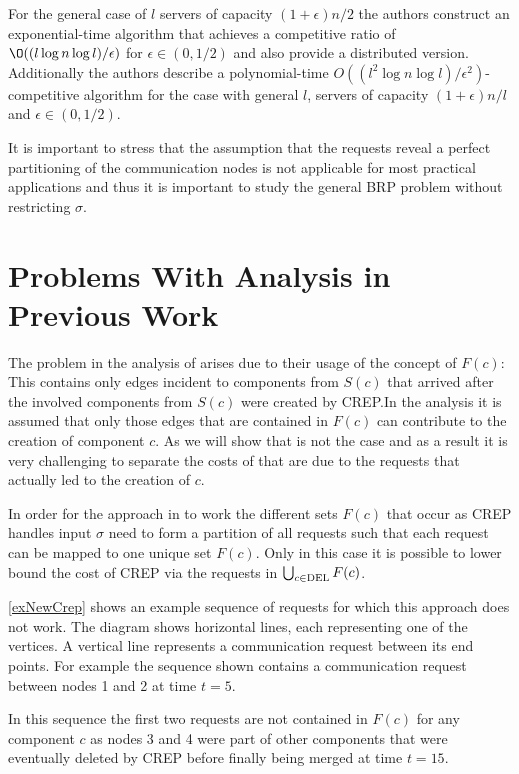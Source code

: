 \documentclass[xcolor=dvipsnames, tikz, 12pt]{article}
\newcommand{\nl}{\newline}
\newcommand{\crep}{C{\scriptsize REP}}
\newcommand{\del}{\text{\scriptsize DEL}}
\newcommand{\opt}{\text{O{\scriptsize PT}}}
\theoremstyle{definition}
\begin{document}
	For the general case of $l$ servers of capacity $(1+\epsilon)n/2$ the authors construct an exponential-time algorithm that achieves a competitive ratio of $\O((l\log n \log l)/\epsilon)$ for $\epsilon\in(0,1/2)$ and also provide a distributed version.
	Additionally the authors describe a polynomial-time $O((l^2\log n\log l)/\epsilon^2)$-competitive algorithm for the case with general $l$, servers of capacity $(1+\epsilon)n/l$ and $\epsilon\in(0,1/2)$.
	
	It is important to stress that the assumption that the requests reveal a perfect partitioning of the communication nodes is not applicable for most practical applications and thus it is important to study the general BRP problem without restricting $\sigma$.
	
	
	\section{Problems With Analysis in Previous Work}
	\label{flawsSection}
	The problem in the analysis of \cite{Avin2015a} arises due to their usage of the concept of $F(c)$: This contains only edges incident to components from $S(c)$ that arrived after the involved components from $S(c)$ were created by \crep{}.In the analysis it is assumed that only those edges that are contained in $F(c)$ can contribute to the creation of component $c$. As we will show that is not the case and as a result it is very challenging to separate the costs of \opt{} that are due to the requests that actually led to the creation of $c$.
	
	In order for the approach in \cite{Avin2015a} to work the different sets $F(c)$ that occur as \crep{} handles input $\sigma$ need to form a partition of all requests such that each request can be mapped to one unique set $F(c)$. Only in this case it is possible to lower bound the cost of \crep{} via the requests in $\bigcup_{c\in\del{}}F(c)$.\
	
	\cref{exNewCrep} shows an example sequence of requests for which this approach does not work. The diagram shows horizontal lines, each representing one of the vertices. A vertical line represents a communication request between its end points. For example the sequence shown contains a communication request between nodes 1 and 2 at time $t=5$.
	
	In this sequence the first two requests are not contained in $F(c)$ for any component $c$ as nodes 3 and 4 were part of other components that were eventually deleted by \crep{} before finally being merged at time $t=15$.\nl
	
\end{document}
